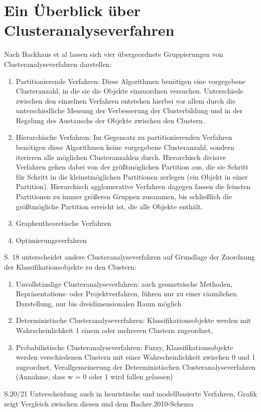 \chapter{Ein Überblick über Clusteranalyseverfahren}

Nach Backhaus et al \cite{Backhaus.2016} lassen sich vier übergeordnete Gruppierungen von Clusteranalyseverfahren darstellen:

\begin{enumerate}
	\item Partitionierende Verfahren: Diese Algorithmen benötigen eine vorgegebene Clusteranzahl, in die sie die Objekte einzuordnen versuchen. Unterschiede zwischen den einzelnen Verfahren entstehen hierbei vor allem durch die unterschiedliche Messung der Verbesserung der Clusterbildung und in der Regelung des Austauschs der Objekte zwischen den Clustern.
	\item Hierarchische Verfahren: Im Gegensatz zu partitionierenden Verfahren benötigen diese Algorithmen keine vorgegebene Clusteranzahl, sondern iterieren alle möglichen Clusteranzahlen durch. Hierarchisch divisive Verfahren gehen dabei von der größtmöglichen Partition aus, die sie Schritt für Schritt in die kleinstmöglichen Partitionen zerlegen (ein Objekt in einer Partition). Hierarchisch agglomerative Verfahren dagegen fassen die feinsten Partitionen zu immer größeren Gruppen zusammen, bis schließlich die größtmögliche Partition erreicht ist, die alle Objekte enthält.
	\item Graphentheoretische Verfahren
	\item Optimierungsverfahren
\end{enumerate}

\cite{Bacher.2010} S. 18 unterscheidet andere Clusteranalyseverfahren auf Grundlage der Zuordnung der Klassifikationsobjekte zu den Clustern:

\begin{enumerate}
	\item Unvollständige Clusteranalyseverfahren: auch geometrische Methoden, Repräsentations- oder Projektverfahren, führen nur zu einer räumlichen Darstellung, nur bis dreidimensionalen Raum möglich
	\item Deterministische Clusteranalyseverfahren: Klassifikationsobjekte werden mit Wahrscheinlichkeit 1 einem oder mehreren Clustern zugeordnet, 
	\item Probabilistische Clusteranalyseverfahren: Fuzzy, Klassifikationsobjekte werden verschiedenen Clustern mit einer Wahrscheinlichkeit zwischen 0 und 1 zugeordnet, Verallgemeinerung der Deterministischen Clusteranalyseverfahren (Annahme, dass w = 0 oder 1 wird fallen gelassen)
\end{enumerate}
S.20/21 \cite{Bacher.2010} Unterscheidung auch in heuristische und modellbasierte Verfahren, Grafik zeigt Vergleich zwischen diesen und dem Bacher.2010-Schema

